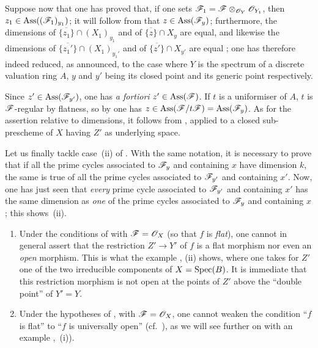\begin{env}[12.1.1.4]
Suppose now that one has proved that, if one sets $\mathscr{F}_1=\mathscr{F}\otimes_{\mathscr{O}_Y}\mathscr{O}_{Y_1}$, then $z_1\in\operatorname{Ass}((\mathscr{F}_1)_{y_1})$; it will follow from  that $z\in\operatorname{Ass}(\mathscr{F}_y)$; furthermore, the dimensions of $\overline{\{z_1\}}\cap(X_1)_{y_1}$ and of $\overline{\{z\}}\cap X_y$ are equal, and likewise the dimensions of $\overline{\{z_1'\}}\cap(X_1)_{y_1'}$ and of $\overline{\{z'\}}\cap X_{y'}$ are equal ; one has therefore indeed reduced, as announced, to the case where $Y$ is the spectrum of a discrete valuation ring $A$, $y$ and $y'$ being its closed point and its generic point respectively.

Since $z'\in\operatorname{Ass}(\mathscr{F}_{y'})$, one has \emph{a fortiori} $z'\in\operatorname{Ass}(\mathscr{F})$.
If $t$ is a uniformiser of $A$, $t$ is $\mathscr{F}$-regular by flatness, so by  one has $z\in\operatorname{Ass}(\mathscr{F}/t\mathscr{F})=\operatorname{Ass}(\mathscr{F}_y)$.
As for the assertion relative to dimensions, it follows from , applied to a closed sub-prescheme of $X$ having $Z'$ as underlying space.

Let us finally tackle case~(ii) of .
With the same notation, it is necessary to prove that if all the prime cycles associated to $\mathscr{F}_y$ and containing $x$ have dimension $k$, the same is true of all the prime cycles associated to $\mathscr{F}_{y'}$ and containing $x'$.
Now, one has just seen that \emph{every} prime cycle associated to $\mathscr{F}_{y'}$ and containing $x'$ has the same dimension as \emph{one} of the prime cycles associated to $\mathscr{F}_y$ and containing $x$; this shows~(ii).
\end{env}

\begin{remarks}[12.1.2]
\label{IV.12.1.2}
\begin{enumerate}[label=(\roman*)]
  \item Under the conditions of  with $\mathscr{F}=\mathscr{O}_X$ (so that $f$ is \emph{flat}), one cannot in general assert that the restriction $Z'\to Y'$ of $f$ is a flat morphism nor even an \emph{open} morphism.
This is what the example ,
(ii) shows, where one takes for $Z'$ one of the two irreducible components of $X=\operatorname{Spec}(B)$.
It is immediate that this restriction morphism is not open at the points of $Z'$ above the ``double point'' of $Y'=Y$.

  \item Under the hypotheses of , with $\mathscr{F}=\mathscr{O}_X$, one cannot weaken the condition ``$f$ is flat'' to ``$f$ is universally open'' (cf.\ ), as we will see further on with an example ,~(i)).
\end{enumerate}
\end{remarks}

